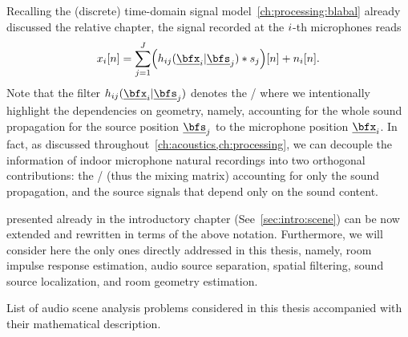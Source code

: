 Recalling the (discrete) time-domain signal model~\cref{ch:processing:blabal} already discussed the relative chapter, the signal recorded at the $i$-th microphones reads
\begin{equation}
    \label{eq:application:stft}
    \mic_\idxMic[n] = \sum_{\idxSrc = 1}^{\numSrcs}
        \kparen{\flt_{\idxMicSrc}( \positionMicrophone_{\idxMic}  | \positionSource_{\idxSrc}) \convDis \src_{\idxSrc}} [n] + \nse_\idxMic[n]
    .
\end{equation}
Note that the filter $\flt_{\idxMicSrc}(\positionMicrophone_{\idxMic} | \positionSource_{\idxSrc})$ denotes the \RIR/ where we intentionally highlight the dependencies on geometry,
namely, accounting for the whole sound propagation for the source position $\positionSource_{\idxSrc}$ to the microphone position $\positionMicrophone_{\idxMic}$.
In fact, as discussed throughout~\cref{ch:acoustics,ch:processing}, we can decouple the information of indoor microphone natural recordings into two orthogonal contributions:
the \RIRs/ (thus the mixing matrix) accounting for only the sound propagation, and the source signals that depend only on the sound content.

\newcommand{\setMicSignals}{\ensuremath{\set{\mic_{\idxMic}}_\idxMic}}
\newcommand{\setSrcSignals}{\ensuremath{\set{\src_{\idxSrc}}_\idxSrc}}
\newcommand{\setSrcPositions}{\ensuremath{\set{\positionSource_{\idxSrc}}_\idxSrc}}
\newcommand{\setFltSignals}{\ensuremath{\set{\flt_{\idxMicSrc}(\positionMicrophone_{\idxMic} | \positionSource_{\idxSrc})}_{\idxMicSrc}}}


 presented already in the introductory chapter (See~\cref{sec:intro:scene}) can be now extended and rewritten in terms of the above notation.
Furthermore, we will consider here the only ones directly addressed in this thesis, namely, room impulse response estimation, audio source separation, spatial filtering, sound source localization, and room geometry estimation.

\begin{table}[!h]

    \begin{fullwidth}
    \centering
    \small
    \renewcommand{\arraystretch}{1.3}

    
    \caption{List of audio scene analysis problems considered in this thesis accompanied with their mathematical description.}
    \label{tab:processing:problems}

    \end{fullwidth}

\end{table}

